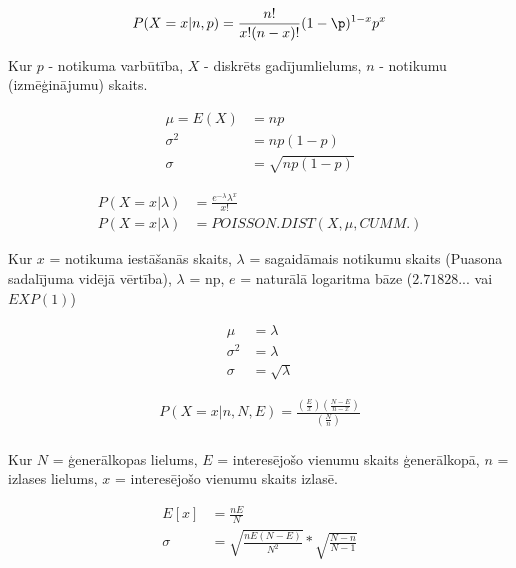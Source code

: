 {\begin{align*}
    P(X=x | n,p)=\displaystyle\frac{n!}{x!(n-x)!}(1-\p)^{1-x}p^x
\end{align*}

Kur $p$ - notikuma varbūtība, $X$ - diskrēts gadījumlielums, $n$ - notikumu
(izmēģinājumu) skaits.}


{\begin{align*}
    \mu = E(X) &= np \\
    \sigma^2 &= np(1-p) \\
    \sigma &= \sqrt{np(1-p)}
\end{align*}}


{\begin{align*}
    P(X=x|\lambda) &= \displaystyle\frac{e^{-\lambda}\lambda^x}{x!} \\
    P(X=x|\lambda) &= POISSON.DIST(X, \mu, CUMM.) 
\end{align*}

Kur $x$ = notikuma iestāšanās skaits, $\lambda$ = sagaidāmais notikumu skaits
(Puasona sadalījuma vidējā vērtība), $\lambda$ = np, $e$ = naturālā logaritma
bāze ($2.71828...$ vai $EXP(1)$)
}
{\begin{align*}
    \mu &= \lambda \\
    \sigma^2 &= \lambda \\
    \sigma &= \sqrt{\lambda}
\end{align*}
}

{\begin{align*}
    P(X=x|n,N,E)=\displaystyle\frac{(\frac{E}{x})(\frac{N-E}{n-x})}{(\frac{N}{n})} \\
\end{align*}

    Kur $N$ = ģenerālkopas lielums, $E$ = interesējošo vienumu skaits
    ģenerālkopā, $n$ = izlases lielums, $x$ = interesējošo vienumu skaits
    izlasē.
}


{\begin{align*}
    E[x]&=\displaystyle\frac{nE}{N} \\
    \sigma &= \sqrt{\displaystyle\frac{nE(N-E)}{N^2}}*\sqrt{\displaystyle\frac{N-n}{N-1}}
\end{align*}}





